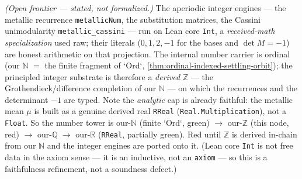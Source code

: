 \begin{theorem}\label{thm:derived-integer-substrate}\notready{}
\emph{(Open frontier --- stated, not formalized.)} The aperiodic integer engines --- the metallic
recurrence \texttt{metallicNum}, the substitution matrices, the Cassini unimodularity
\texttt{metallic\_cassini} --- run on Lean core \texttt{Int}, a \emph{received-math specialization} used
raw; their literals ($0,1,2,-1$ for the bases and $\det M=-1$) are honest arithmetic on that
projection. The internal number carrier is ordinal (our $\mathbb N$ $=$ the finite fragment of `Ord`,
\cref{thm:ordinal-indexed-settling-orbit}); the principled integer substrate is therefore a
\emph{derived} $\mathbb Z$ --- the Grothendieck/difference completion of our $\mathbb N$ --- on
which the recurrences and the determinant $-1$ are typed. Note the \emph{analytic} cap is already
faithful: the metallic mean $\mu$ is built as a genuine derived real \texttt{RReal}
(\texttt{Real.Multiplication}), not a \texttt{Float}. So the number tower is our-$\mathbb N$
(finite `Ord`, green) $\to$ our-$\mathbb Z$ (this node, red) $\to$ our-$\mathbb Q$ $\to$ our-$\mathbb R$
(\texttt{RReal}, partially green). Red until $\mathbb Z$ is derived in-chain from our $\mathbb N$ and
the integer engines are ported onto it. (Lean core \texttt{Int} is not free data in the axiom sense
--- it is an inductive, not an \texttt{axiom} --- so this is a faithfulness refinement, not a
soundness defect.)
\end{theorem}
